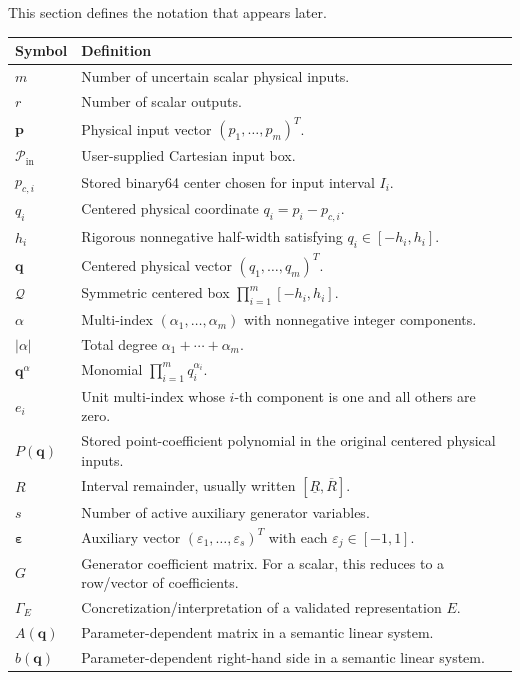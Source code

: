 \documentclass[11pt]{article}
\newcommand{\Qdom}{\mathcal{Q}}
\newcommand{\Pin}{\mathcal{P}_{\mathrm{in}}}
\newcommand{\eps}{\varepsilon}
\newcommand{\epsv}{\boldsymbol{\varepsilon}}
\newcommand{\qv}{\mathbf{q}}
\newcommand{\pv}{\mathbf{p}}
\begin{document}
This section defines the notation that appears later.

\begin{longtable}{p{}p{}}
\toprule
Symbol & Definition \\
\midrule
\endhead
\(m\) & Number of uncertain scalar physical inputs. \\
\(r\) & Number of scalar outputs. \\
\(\pv\) & Physical input vector \((p_1,\ldots,p_m)^T\). \\
\(\Pin\) & User-supplied Cartesian input box. \\
\(p_{c,i}\) & Stored binary64 center chosen for input interval \(I_i\). \\
\(q_i\) & Centered physical coordinate \(q_i=p_i-p_{c,i}\). \\
\(h_i\) & Rigorous nonnegative half-width satisfying \(q_i\in[-h_i,h_i]\). \\
\(\qv\) & Centered physical vector \((q_1,\ldots,q_m)^T\). \\
\(\Qdom\) & Symmetric centered box \(\prod_{i=1}^m[-h_i,h_i]\). \\
\(\alpha\) & Multi-index \((\alpha_1,\ldots,\alpha_m)\) with nonnegative integer components. \\
\(|\alpha|\) & Total degree \(\alpha_1+\cdots+\alpha_m\). \\
\(\qv^\alpha\) & Monomial \(\prod_{i=1}^m q_i^{\alpha_i}\). \\
\(e_i\) & Unit multi-index whose \(i\)-th component is one and all others are zero. \\
\(P(\qv)\) & Stored point-coefficient polynomial in the original centered physical inputs. \\
\(R\) & Interval remainder, usually written \([\underline R,\overline R]\). \\
\(s\) & Number of active auxiliary generator variables. \\
\(\epsv\) & Auxiliary vector \((\eps_1,\ldots,\eps_s)^T\) with each \(\eps_j\in[-1,1]\). \\
\(G\) & Generator coefficient matrix.  For a scalar, this reduces to a row/vector of coefficients. \\
\(\Gamma_E\) & Concretization/interpretation of a validated representation \(E\). \\
\(A(\qv)\) & Parameter-dependent matrix in a semantic linear system. \\
\(b(\qv)\) & Parameter-dependent right-hand side in a semantic linear system. \\

\end{longtable}
\end{document}
